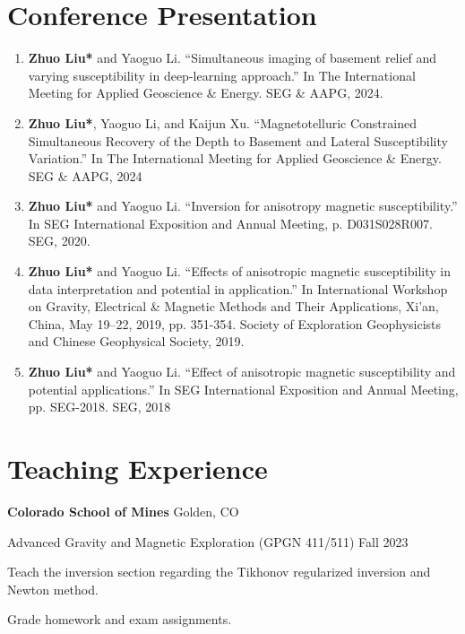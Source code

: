\documentclass[paper=a4,fontsize=11pt]{scrartcl} %
\newcommand{\sepspace}{\vspace*{0.5em}}		%
\newcommand{\NewPart}[1]{\section*{{#1}}}
\begin{document}
\NewPart{Conference Presentation}{}
\begin{enumerate}
    \item \textbf{Zhuo Liu*}  and Yaoguo Li. “Simultaneous imaging of basement relief and varying susceptibility in deep-learning approach.” In The International Meeting for Applied Geoscience \& Energy. SEG \& AAPG, 2024.
    \item \textbf{Zhuo Liu*}, Yaoguo Li, and Kaijun Xu. “Magnetotelluric Constrained Simultaneous Recovery of the Depth to Basement and Lateral Susceptibility Variation.” In The International Meeting for Applied Geoscience \& Energy. SEG \& AAPG, 2024
    \item \textbf{Zhuo Liu*} and Yaoguo Li. “Inversion for anisotropy magnetic susceptibility.” In SEG International Exposition and Annual Meeting, p. D031S028R007. SEG, 2020.
    \item \textbf{Zhuo Liu*} and Yaoguo Li. “Effects of anisotropic magnetic susceptibility in data interpretation and potential in application.” In International Workshop on Gravity, Electrical \& Magnetic Methods and Their Applications, Xi'an, China, May 19–22, 2019, pp. 351-354. Society of Exploration Geophysicists and Chinese Geophysical Society, 2019.
    \item \textbf{Zhuo Liu*} and Yaoguo Li. “Effect of anisotropic magnetic susceptibility and potential applications.” In SEG International Exposition and Annual Meeting, pp. SEG-2018. SEG, 2018
\end{enumerate}
\sepspace




\NewPart{Teaching Experience}{}
\hspace{2em} \textbf{Colorado School of Mines} \hspace{27.5em} Golden, CO

\hspace{0em} Advanced Gravity and Magnetic Exploration (GPGN 411/511)  \hspace{12.8em} Fall 2023

\hspace{0em} \textbullet \hspace{1em} Teach the inversion section regarding the Tikhonov regularized inversion and Newton method.

\hspace{0em} \textbullet \hspace{1em} Grade homework and exam assignments.
\end{document}
